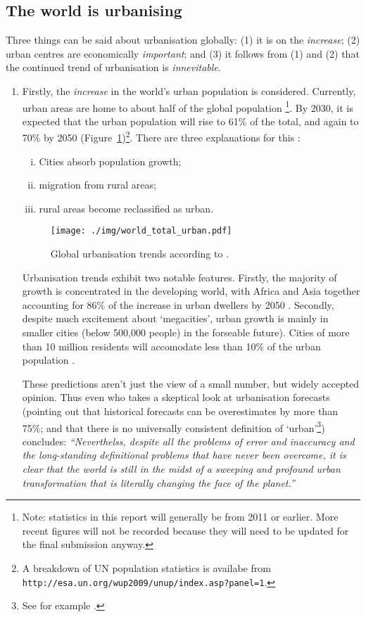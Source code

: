\subsection{The world is urbanising}
Three things can be said about urbanisation globally: (1) it is on the \emph{increase}; (2) urban centres are economically \emph{important}; and (3) it follows from (1) and (2) that the continued trend of urbanisation is \emph{innevitable}. 
\begin{enumerate}
	\item Firstly, the \emph{increase} in the world's urban population is considered. Currently, urban areas are home to about half of the global population \citep{AREAS2012}\footnote{Note: statistics in this report will generally be from 2011 or earlier. More recent figures will not be recorded because they will need to be updated for the final submission anyway.}. By 2030, it is expected that the urban population will rise to 61\% of the total, and again to 70\% by 2050 (Figure~\ref{fig:urban_trends})\footnote{A breakdown of UN population statistics is availabe from \texttt{http://esa.un.org/wup2009/unup/index.asp?panel=1}.}. There are three explanations for this \citep{Cohen2006}:
	\begin{enumerate}[(i)]
		\item Cities absorb population growth; 
		\item migration from rural areas;
		\item rural areas become reclassified as urban. 
	\end{enumerate}	

\begin{figure}
	\centering
	\texttt{[image: ./img/world\_total\_urban.pdf]} 
	\caption{Global urbanisation trends according to \citet{AREAS2012}.} \label{fig:urban_trends}
\end{figure}

	Urbanisation trends exhibit two notable features. Firstly, the majority of growth is concentrated in the developing world, with Africa and Asia together accounting for 86\% of the increase in urban dwellers by 2050 \citep{York2011}. Secondly, despite much excitement about `megacities', urban growth is mainly in smaller cities (below 500,000 people) in the forseable future). Cities of more than 10 million residents will accomodate less than 10\% of the urban population \citep{Cohen2006}.


These predictions aren't just the view of a small number, but widely accepted opinion. Thus even \citet{Cohen2004} who takes a skeptical look at urbanisation forecasts (pointing out that historical forecasts can be overestimates by more than 75\%; and that there is no universally consistent definition of `urban'\footnote{See for example \citet{DepartmentforCommunitiesandLocalGovernment2006}.}) concludes: \emph{``Neverthelss, despite all the problems of error and inaccuracy and the long-standing definitional problems that have never been overcome, it is clear that the world is still in the midst of a sweeping and profound urban transformation that is literally changing the face of the planet.''}


\end{enumerate}
